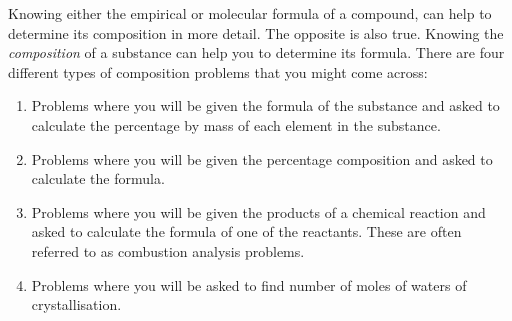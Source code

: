       \label{m38712*id280450}Knowing either the empirical or molecular formula of a compound, can help to determine its composition in more detail. The opposite is also true. Knowing the \textsl{composition} of a substance can help you to determine its formula. There are four different types of composition problems that you might come across:\par 
      \label{m38712*id280463}\begin{enumerate}[noitemsep, label=\textbf{\arabic*}. ] 
            \label{m38712*uid68}\item Problems where you will be given the formula of the substance and asked to calculate the percentage by mass of each element in the substance.
\label{m38712*uid69}\item Problems where you will be given the percentage composition and asked to calculate the formula.
\label{m38712*uid70}\item Problems where you will be given the products of a chemical reaction and asked to calculate the formula of one of the reactants. These are often referred to as combustion analysis problems.
\label{m38712*uid7021}\item Problems where you will be asked to find number of moles of waters of crystallisation.
\end{enumerate}
\par
            \label{m38712*secfhsst!!!underscore!!!id901}\vspace{.5cm} 
      \noindent
